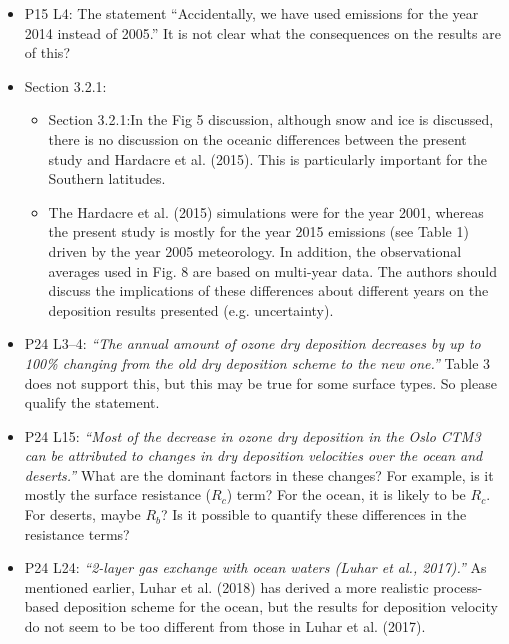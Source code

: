 \documentclass{scrartcl}
\begin{document}
\begin{itemize}
\item {\color{blue}  P15 L4: The statement “Accidentally, we have used emissions for the year
  2014 instead of 2005.” It is not clear what the consequences on the results are of this? }
  \emph{}
  
\item {\color{blue}  Section 3.2.1: }
  \begin{itemize}
  \item {\color{blue}  Section 3.2.1:In the Fig 5 discussion, although snow and ice is discussed, there is
    no discussion on the oceanic differences between the present study and Hardacre et
    al. (2015). This is particularly important for the Southern latitudes.}
    \emph{}
    
  \item {\color{blue}  The Hardacre et al. (2015) simulations were for the year 2001,
    whereas the present study is mostly for the year 2015 emissions (see Table 1) driven
    by the year 2005 meteorology. In addition, the observational averages used in Fig. 8
    are based on multi-year data. The authors should discuss the implications of these
    differences about different years on the deposition results presented (e.g. uncertainty).}
    \emph{}
  \end{itemize}
  
\item {\color{blue}  P24 L3--4: \emph{“The annual amount of ozone dry deposition decreases by up
to 100\% changing from the old dry deposition scheme to the new one.”} Table 3 does
not support this, but this may be true for some surface types. So please qualify the
statement.}
  \emph{}
  
\item {\color{blue}  P24 L15: \emph{“Most of the decrease in ozone dry deposition in the Oslo CTM3
can be attributed to changes in dry deposition velocities over the ocean and deserts.”}
What are the dominant factors in these changes? For example, is it mostly the surface
resistance ($R_c$) term? For the ocean, it is likely to be $R_c$. For deserts, maybe $R_b$? Is it
possible to quantify these differences in the resistance terms?}
  \emph{}
  
\item {\color{blue}  P24 L24: \emph{“2-layer gas exchange with ocean waters (Luhar et al., 2017).”}
As mentioned earlier, Luhar et al. (2018) has derived a more realistic process-based
deposition scheme for the ocean, but the results for deposition velocity do not seem to
be too different from those in Luhar et al. (2017).}
  \emph{}
  

\end{itemize}
\end{document}
